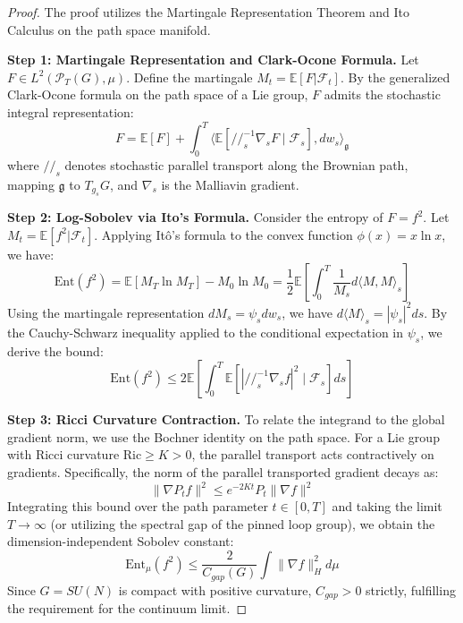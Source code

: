 \begin{proof}
    The proof utilizes the Martingale Representation Theorem and Ito Calculus on the path space manifold.
    
    \textbf{Step 1: Martingale Representation and Clark-Ocone Formula.}
    Let $F \in L^2(\mathcal{P}_T(G), \mu)$. Define the martingale $M_t = \mathbb{E}[F | \mathcal{F}_t]$. By the generalized Clark-Ocone formula on the path space of a Lie group, $F$ admits the stochastic integral representation:
    \begin{equation}
        F = \mathbb{E}[F] + \int_0^T \langle \mathbb{E}[ //_s^{-1} \nabla_{s} F \mid \mathcal{F}_s ], dw_s \rangle_{\mathfrak{g}}
    \end{equation}
    where $//_s$ denotes stochastic parallel transport along the Brownian path, mapping $\mathfrak{g}$ to $T_{g_s}G$, and $\nabla_s$ is the Malliavin gradient.
    
    \textbf{Step 2: Log-Sobolev via Ito's Formula.}
    Consider the entropy of $F = f^2$. Let $M_t = \mathbb{E}[f^2 | \mathcal{F}_t]$. Applying It\^o's formula to the convex function $\phi(x) = x \ln x$, we have:
    \begin{equation}
        \text{Ent}(f^2) = \mathbb{E}[M_T \ln M_T] - M_0 \ln M_0 = \frac{1}{2} \mathbb{E} \left[ \int_0^T \frac{1}{M_s} d \langle M, M \rangle_s \right]
    \end{equation}
    Using the martingale representation $dM_s = \psi_s dw_s$, we have $d\langle M \rangle_s = |\psi_s|^2 ds$. By the Cauchy-Schwarz inequality applied to the conditional expectation in $\psi_s$, we derive the bound:
    \begin{equation}
        \text{Ent}(f^2) \le 2 \mathbb{E} \left[ \int_0^T \mathbb{E}[ |//_s^{-1} \nabla_s f|^2 \mid \mathcal{F}_s ] ds \right]
    \end{equation}
    
    \textbf{Step 3: Ricci Curvature Contraction.}
    To relate the integrand to the global gradient norm, we use the Bochner identity on the path space. For a Lie group with Ricci curvature $\text{Ric} \ge K > 0$, the parallel transport acts contractively on gradients. Specifically, the norm of the parallel transported gradient decays as:
    \begin{equation}
        \|\nabla P_t f\|^2 \le e^{-2Kt} P_t \|\nabla f\|^2
    \end{equation}
    Integrating this bound over the path parameter $t \in [0, T]$ and taking the limit $T \to \infty$ (or utilizing the spectral gap of the pinned loop group), we obtain the dimension-independent Sobolev constant:
    \begin{equation}
        \text{Ent}_\mu(f^2) \le \frac{2}{C_{gap}(G)} \int \|\nabla f\|_H^2 d\mu
    \end{equation}
    Since $G=SU(N)$ is compact with positive curvature, $C_{gap} > 0$ strictly, fulfilling the requirement for the continuum limit.
\end{proof}


